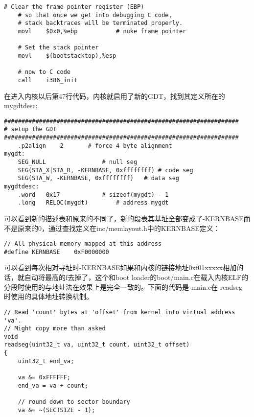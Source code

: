 \documentclass{article}
\begin{document}
\begin{CJK*}{UTF8}{gkai}
\begin{lstlisting}[style=acode, firstnumber=42, title={\scriptsize \ttfamily \bfseries kern/entry.S}]
    # Clear the frame pointer register (EBP)
    # so that once we get into debugging C code,
    # stack backtraces will be terminated properly.
    movl    $0x0,%ebp           # nuke frame pointer

    # Set the stack pointer
    movl    $(bootstacktop),%esp

    # now to C code
    call    i386_init
\end{lstlisting}

在进入内核以后第47行代码，内核就启用了新的GDT，找到其定义所在的mygdtdesc:

\begin{lstlisting}[style=acode, firstnumber=93, title={\scriptsize \ttfamily \bfseries kern/entry.S}]
###################################################################
# setup the GDT 
###################################################################
    .p2align    2       # force 4 byte alignment
mygdt:
    SEG_NULL                # null seg
    SEG(STA_X|STA_R, -KERNBASE, 0xffffffff) # code seg
    SEG(STA_W, -KERNBASE, 0xffffffff)   # data seg
mygdtdesc:
    .word   0x17            # sizeof(mygdt) - 1
    .long   RELOC(mygdt)        # address mygdt
\end{lstlisting}

可以看到新的描述表和原来的不同了，新的段表其基址全部变成了-KERNBASE而不是原来的0，通过查找定义在inc/memlayout.h中的KERNBASE定义：

\begin{lstlisting}[style=ccode, firstnumber=81, title={\scriptsize \ttfamily \bfseries inc/memlayout.h}]
// All physical memory mapped at this address
#define KERNBASE    0xF0000000
\end{lstlisting}

可以看到每次相对寻址时-KERNBASE如果和内核的链接地址0xf01xxxxx相加的话，就自动将最高的f去掉了，这个和boot loader的boot/main.c在载入内核ELF的分段时使用的与地址法在效果上是完全一致的。下面的代码是 main.c在 readseg 时使用的具体地址转换机制。

\begin{lstlisting}[style=ccode, firstnumber=67, title={\scriptsize \ttfamily \bfseries boot/main.c}]
// Read 'count' bytes at 'offset' from kernel into virtual address 'va'.
// Might copy more than asked
void
readseg(uint32_t va, uint32_t count, uint32_t offset)
{
    uint32_t end_va;

    va &= 0xFFFFFF;
    end_va = va + count;

    // round down to sector boundary
    va &= ~(SECTSIZE - 1);
\end{lstlisting}



\end{CJK*}
\end{document}
